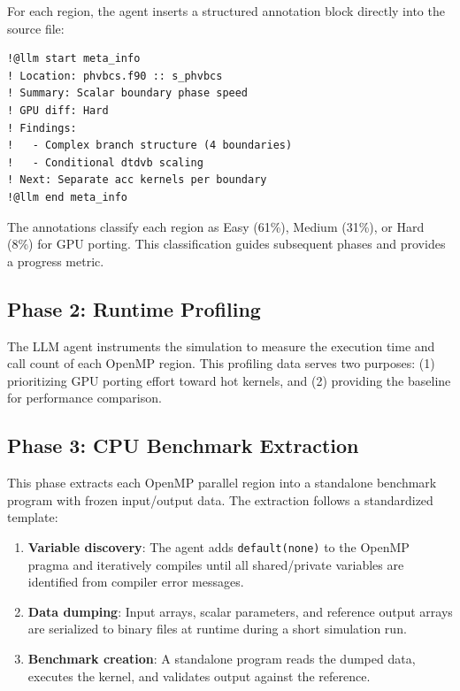 \documentclass[conference]{IEEEtran}
\begin{document}
For each region, the agent inserts a structured annotation block directly
into the source file:

\begin{lstlisting}[style=fortran, caption={Meta-information annotation format.}, label={lst:meta}]
!@llm start meta_info
! Location: phvbcs.f90 :: s_phvbcs
! Summary: Scalar boundary phase speed
! GPU diff: Hard
! Findings:
!   - Complex branch structure (4 boundaries)
!   - Conditional dtdvb scaling
! Next: Separate acc kernels per boundary
!@llm end meta_info
\end{lstlisting}

The annotations classify each region as Easy (61\%), Medium (31\%), or Hard
(8\%) for GPU porting. This classification guides subsequent phases and
provides a progress metric.

\subsection{Phase 2: Runtime Profiling}

The LLM agent instruments the simulation to measure the execution time and
call count of each OpenMP region. This profiling data serves two purposes:
(1) prioritizing GPU porting effort toward hot kernels, and (2) providing
the baseline for performance comparison.

\subsection{Phase 3: CPU Benchmark Extraction}

This phase extracts each OpenMP parallel region into a standalone benchmark
program with frozen input/output data. The extraction follows a standardized
template:

\begin{enumerate}
\item \textbf{Variable discovery}: The agent adds \texttt{default(none)} to
  the OpenMP pragma and iteratively compiles until all shared/private
  variables are identified from compiler error messages.

\item \textbf{Data dumping}: Input arrays, scalar parameters, and reference
  output arrays are serialized to binary files at runtime during a short
  simulation run.

\item \textbf{Benchmark creation}: A standalone program reads the dumped data,
  executes the kernel, and validates output against the reference.
\end{enumerate}
\end{document}
